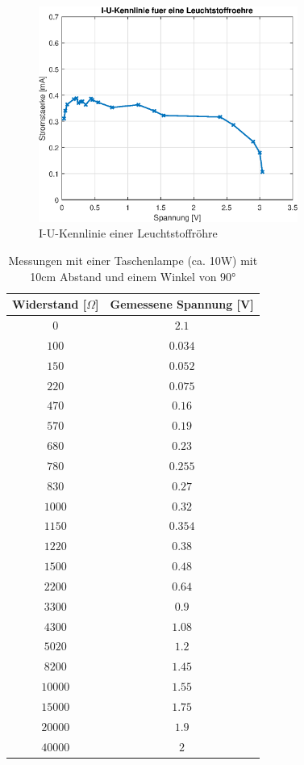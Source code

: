 \begin{figure}[htb]
\centering
\includegraphics[width=8.5cm]{pictures/I-U/Leuchtstoffroehre-UI.eps}
\caption{I-U-Kennlinie einer Leuchtstoffröhre}
\label{fig:I_U_Leuchtstoffroehre}
\end{figure}

\clearpage
\begin{table}[htb]
\centering
\caption{Messungen mit einer Taschenlampe (ca. 10W) mit 10cm Abstand und einem Winkel von $\ang{90}$}
\label{Taschenlampe}
\begin{tabular}{cc}
\toprule
Widerstand [$\Omega$] & Gemessene Spannung [V]\\
\midrule
$0$ & $2.1$\\
$100$ & $0.034$\\
$150$ & $0.052$\\
$220$ & $0.075$\\
$470$ & $0.16$\\
$570$ & $0.19$\\
$680$ & $0.23$\\
$780$ & $0.255$\\
$830$ & $0.27$\\
$1000$ & $0.32$\\
$1150$ & $0.354$\\
$1220$ & $0.38$\\
$1500$ & $0.48$\\
$2200$ & $0.64$\\
$3300$ & $0.9$\\
$4300$ & $1.08$\\
$5020$ & $1.2$\\
$8200$ & $1.45$\\
$10000$ & $1.55$\\
$15000$ & $1.75$\\
$20000$ & $1.9$\\
$40000$ & $2$\\
\bottomrule
\end{tabular}
\end{table}

